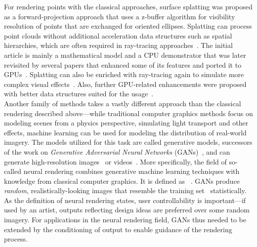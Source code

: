 For rendering points with the classical approaches, surface splatting was proposed as a forward-projection approach that uses a z-buffer
algorithm for visibility resolution of points that are exchanged for oriented ellipses. Splatting can process point clouds
without additional acceleration data structures such as spatial hierarchies, which are
often required in ray-tracing approaches~\citep{PointRendering}. The initial article is mainly
a mathematical model and a CPU demonstrator that was later revisited by several papers that enhanced some of its
features and ported it to GPUs~\citep{Splatting2, Splatting3, Splatting4, Splatting5, Splatting6}.
Splatting can also be enriched with ray-tracing again to simulate more complex visual effects~\citep{SplattingTracing}.
Also, further GPU-related enhancements were proposed with better data structures suited for the usage~\citep{SequentialTrees}.\\

Another family of methods takes a vastly different approach than the classical rendering described
above---while traditional computer graphics
methods focus on modeling scenes from a physics perspective, simulating light transport and other effects,
machine learning can be used for modeling the distribution of real-world imagery. The models utilized for this task
are called generative models, successors of the work on \emph{Generative Adversarial Neural Networks}
(GANs)~\citep{GAN}, and can generate high-resolution images~\citep{ICLR, ICLR2} or videos~\citep{VPT, CDS}.
More specifically, the field of so-called neural rendering 
combines generative machine learning techniques with knowledge from classical computer
graphics. It is defined as ~\citep{SOTARendering}. GANs produce \emph{random}, realistically-looking images that resemble
the training set~\citep{DGM} statistically. As the definition of neural rendering states, user controllability
is important---if used by an artist, outputs reflecting design ideas are preferred over some random imagery.
For applications in the neural rendering field, GANs thus needed to be extended by the conditioning of output
to enable guidance of the rendering process.

